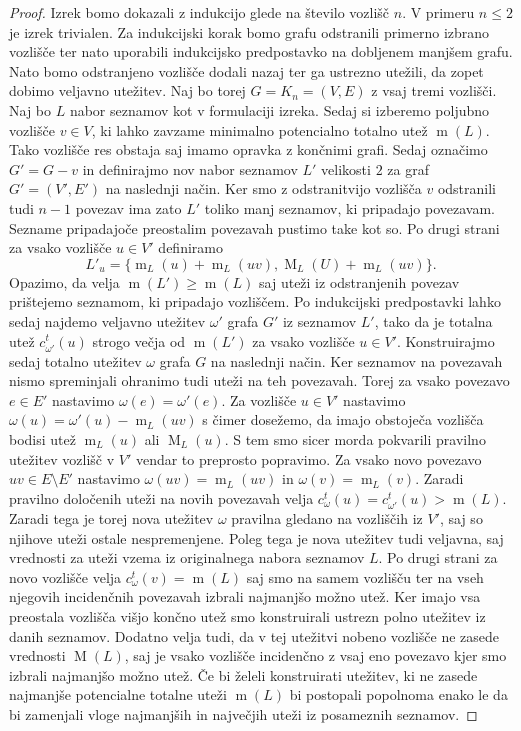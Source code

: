 \documentclass[12pt,a4paper,twoside]{article}
\theoremstyle{definition} %
\theoremstyle{plain} %
\numberwithin{equation}{section}  %
\DeclareMathOperator{\m}{m}
\DeclareMathOperator{\M}{M}
\begin{document}
\begin{proof}
Izrek bomo dokazali z indukcijo glede na število vozlišč $n$. V primeru $n \le 2$ je izrek trivialen. Za indukcijski korak bomo grafu odstranili primerno izbrano vozlišče ter nato uporabili indukcijsko predpostavko na dobljenem manjšem grafu. Nato bomo odstranjeno vozlišče dodali nazaj ter ga ustrezno utežili, da zopet dobimo veljavno utežitev. Naj bo torej $G = K_n = (V, E)$ z vsaj tremi vozlišči. Naj bo $L$ nabor seznamov kot v formulaciji izreka. Sedaj si izberemo poljubno vozlišče $v \in V$, ki lahko zavzame minimalno potencialno totalno utež $\m(L)$. Tako vozlišče res obstaja saj imamo opravka z končnimi grafi. Sedaj označimo $G' = G - v$ in definirajmo nov nabor seznamov $L'$ velikosti $2$ za graf $G' = (V', E')$ na naslednji način. Ker smo z odstranitvijo vozlišča $v$ odstranili tudi $n-1$ povezav ima zato $L'$ toliko manj seznamov, ki pripadajo povezavam. Sezname pripadajoče preostalim povezavah pustimo take kot so. Po drugi strani za vsako vozlišče $u \in V'$ definiramo 
$$L'_u = \{\m_L(u) + \m_L(uv), \M_L(U) + \m_L(uv) \}. $$
Opazimo, da velja $\m(L') \ge \m(L)$ saj uteži iz odstranjenih povezav prištejemo seznamom, ki pripadajo vozliščem. Po indukcijski predpostavki lahko sedaj najdemo veljavno utežitev $\omega'$ grafa $G'$ iz seznamov $L'$, tako da je totalna utež $c_{\omega'}^t(u)$ strogo večja od $\m(L')$ za vsako vozlišče $u \in V'$. Konstruirajmo sedaj totalno utežitev $\omega$ grafa $G$ na naslednji način. Ker seznamov na povezavah nismo spreminjali ohranimo tudi uteži na teh povezavah. Torej za vsako povezavo $e \in E'$ nastavimo $\omega(e) = \omega'(e)$. Za vozlišče $u \in V'$ nastavimo $\omega(u) = \omega'(u) - \m_L(uv)$ s čimer dosežemo, da imajo obstoječa vozlišča bodisi utež $\m_L(u)$ ali $\M_L(u)$. S tem smo sicer morda pokvarili pravilno utežitev vozlišč v $V'$ vendar to preprosto popravimo. Za vsako novo povezavo $uv \in E \setminus E'$ nastavimo $\omega(uv) = \m_L(uv)$ in $\omega(v)= \m_L(v)$. Zaradi pravilno določenih uteži na novih povezavah velja $c_{\omega}^t(u) =c_{\omega'}^t(u) > \m(L)$. Zaradi tega je torej nova utežitev $\omega$ pravilna gledano na vozliščih iz $V'$, saj so njihove uteži ostale nespremenjene. Poleg tega je nova utežitev tudi veljavna, saj vrednosti za uteži vzema iz originalnega nabora seznamov $L$. Po drugi strani za novo vozlišče velja $c_{\omega}^t(v) = \m(L)$ saj smo na samem vozlišču ter na vseh njegovih incidenčnih povezavah izbrali najmanjšo možno utež. Ker imajo vsa preostala vozlišča višjo končno utež smo konstruirali ustrezn polno utežitev iz danih seznamov. Dodatno velja tudi, da v tej utežitvi nobeno vozlišče ne zasede vrednosti $\M(L)$, saj je vsako vozlišče incidenčno z vsaj eno povezavo kjer smo izbrali najmanjšo možno utež.
Če bi želeli konstruirati utežitev, ki ne zasede najmanjše potencialne totalne uteži $\m(L)$ bi postopali popolnoma enako le da bi zamenjali vloge najmanjših in največjih uteži iz posameznih seznamov.
\end{proof}
\end{document}
